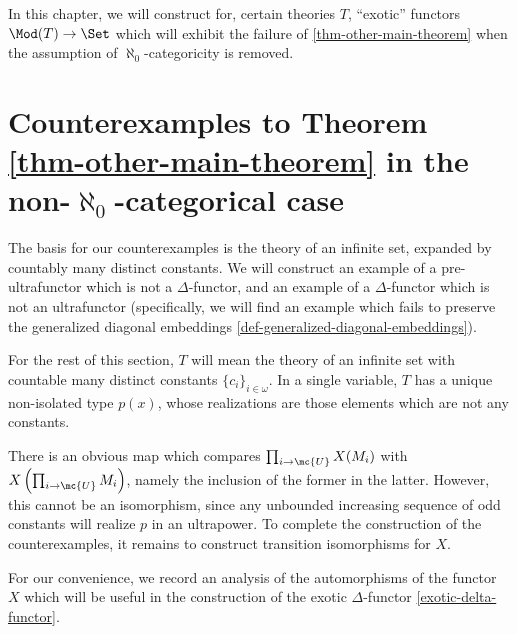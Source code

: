\label{chap-exotic-functors}
In this chapter, we will construct for, certain theories $T$, ``exotic'' functors $\Mod(T) \to \Set$ which will exhibit the failure of \ref{thm-other-main-theorem} when the assumption of $\aleph_0$-categoricity is removed.

\section{Counterexamples to Theorem \ref{thm-other-main-theorem} in the non-$\aleph_0$-categorical case}
\label{first-batch}
The basis for our  counterexamples is the theory of an infinite set, expanded by countably many distinct constants. We will construct an example of a pre-ultrafunctor which is not a $\Delta$-functor, and an example of a $\Delta$-functor which is not an ultrafunctor (specifically, we will find an example which fails to preserve the generalized diagonal embeddings \ref{def-generalized-diagonal-embeddings}).

For the rest of this section, $T$ will mean the theory of an infinite set with countable many distinct constants $\{c_i\}_{i \in \omega}$. In a single variable, $T$ has a unique non-isolated type $p(x)$, whose realizations are those elements which are not any constants.


There is an obvious map which compares $\prod_{i \to \mc{U}} X(M_i)$ with $X \left(\prod_{i \to \mc{U}} M_i \right)$, namely the inclusion of the former in the latter. However, this cannot be an isomorphism, since any unbounded increasing sequence of odd constants will realize $p$ in an ultrapower. To complete the construction of the counterexamples, it remains to construct transition isomorphisms for $X$.

For our convenience, we record an analysis of the automorphisms of the functor $X$ which will be useful in the construction of the exotic $\Delta$-functor \ref{exotic-delta-functor}.


